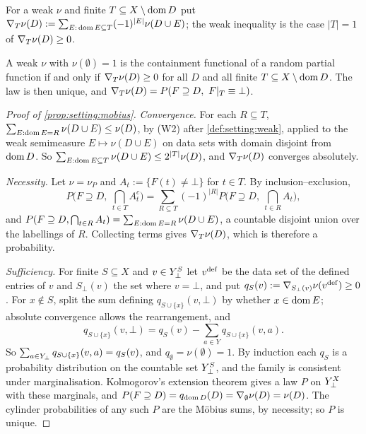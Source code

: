 For a weak $\nu$ and finite $T\subseteq X\setminus\operatorname{dom} D$ put $\nabla_T\nu(D):=\sum_{E:\,\operatorname{dom} E\subseteq T}(-1)^{|E|}\nu(D\cup E)$; the weak inequality is the case $|T|=1$ of $\nabla_T\nu(D)\ge0$.

\begin{proposition}\label{prop:setting:mobius}
A weak $\nu$ with $\nu(\emptyset)=1$ is the containment functional of a random partial function if and only if $\nabla_T\nu(D)\ge0$ for all $D$ and all finite $T\subseteq X\setminus\operatorname{dom} D$. The law is then unique, and $\Mob_T\nu(D)=P(F\supseteq D,\ F|_T\equiv\bot)$.
\end{proposition}

\begin{proof}[Proof of \cref{prop:setting:mobius}]
\emph{Convergence.} For each $R\subseteq T$, $\sum_{E:\operatorname{dom} E=R}\nu(D\cup E)\le\nu(D)$, by (W2) after \cref{def:setting:weak}, applied to the weak semimeasure $E\mapsto\nu(D\cup E)$ on data sets with domain disjoint from $\operatorname{dom} D$. So $\sum_{E:\operatorname{dom} E\subseteq T}\nu(D\cup E)\le2^{|T|}\nu(D)$, and $\nabla_T\nu(D)$ converges absolutely.

\emph{Necessity.} Let $\nu=\nu_P$ and $A_t:=\{F(t)\ne\bot\}$ for $t\in T$. By inclusion--exclusion,
\[
P\Big(F\supseteq D,\ \textstyle\bigcap_{t\in T}A_t^c\Big)=\sum_{R\subseteq T}(-1)^{|R|}P\Big(F\supseteq D,\ \textstyle\bigcap_{t\in R}A_t\Big),
\]
and $P(F\supseteq D,\bigcap_{t\in R}A_t)=\sum_{E:\operatorname{dom} E=R}\nu(D\cup E)$, a countable disjoint union over the labellings of $R$. Collecting terms gives $\nabla_T\nu(D)$, which is therefore a probability.

\emph{Sufficiency.} For finite $S\subseteq X$ and $v\in Y_{\bot}^S$ let $v^{\rm def}$ be the data set of the defined entries of $v$ and $S_\bot(v)$ the set where $v=\bot$, and put $q_S(v):=\nabla_{S_\bot(v)}\nu(v^{\rm def})\ge0$. For $x\notin S$, split the sum defining $q_{S\cup\{x\}}(v,\bot)$ by whether $x\in\operatorname{dom} E$; absolute convergence allows the rearrangement, and
\[
q_{S\cup\{x\}}(v,\bot)=q_S(v)-\textstyle\sum_{a\in Y}q_{S\cup\{x\}}(v,a).
\]
So $\sum_{a\in Y_{\bot}}q_{S\cup\{x\}}(v,a)=q_S(v)$, and $q_\emptyset=\nu(\emptyset)=1$. By induction each $q_S$ is a probability distribution on the countable set $Y_{\bot}^S$, and the family is consistent under marginalisation. Kolmogorov's extension theorem gives a law $P$ on $Y_{\bot}^X$ with these marginals, and $P(F\supseteq D)=q_{\operatorname{dom} D}(D)=\nabla_\emptyset\nu(D)=\nu(D)$. The cylinder probabilities of any such $P$ are the Möbius sums, by necessity; so $P$ is unique.
\end{proof}

